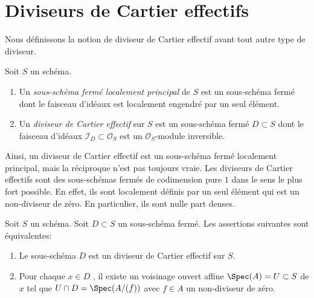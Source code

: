 \section{Diviseurs de Cartier effectifs}
\label{section-effective-Cartier-divisors}

\noindent
Nous définissons la notion de diviseur de Cartier effectif avant tout autre type
de diviseur.

\begin{definition}
\label{definition-effective-Cartier-divisor}
Soit  $S$  un schéma.
\begin{enumerate}
\item Un {\it sous-schéma fermé localement principal}  de
 $S$ est un sous-schéma fermé dont le faisceau d'idéaux est localement
engendré par un seul élément.
\item Un {\it diviseur de Cartier effectif} sur $S$
est un sous-schéma fermé  $D \subset S$ dont le faisceau d'idéaux $\mathcal{I}_D \subset \mathcal{O}_S$  est
un $\mathcal{O}_S$-module inversible.
\end{enumerate}
\end{definition}

\noindent
Ainsi, un diviseur de Cartier effectif est un sous-schéma fermé localement
principal, mais la réciproque n'est pas toujours vraie. Les diviseurs de Cartier
effectifs sont des sous-schémas fermés de codimension pure  $1$  dans le
sens le plus fort possible. En effet, ils sont localement définis par un seul
élément qui est un non-diviseur de zéro. En particulier, ils sont nulle part
denses.

\begin{lemma}
\label{lemma-characterize-effective-Cartier-divisor}
Soit  $S$  un schéma. Soit  $D \subset S$  un sous-schéma fermé. Les
assertions suivantes sont équivalentes:
\begin{enumerate}
\item Le sous-schéma  $D$  est un diviseur de Cartier effectif sur  $S$.
\item Pour chaque  $x \in D$ , il existe un voisinage ouvert affine  $\Spec(A) = U \subset S$  de
 $x$  tel que  $U \cap D = \Spec(A/(f))$  avec  $f \in A$  un non-diviseur de zéro.
\end{enumerate}
\end{lemma}

